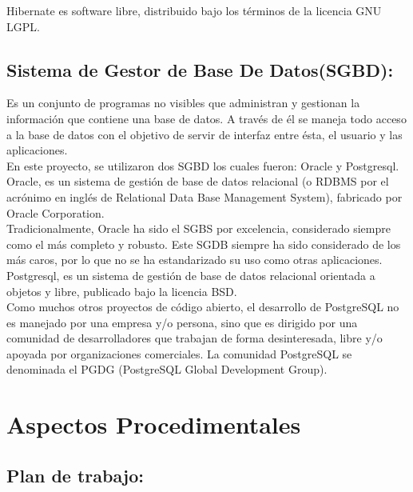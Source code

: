 \documentclass[12pt,oneside]{book}
\begin{document}
	Hibernate es software libre, distribuido bajo los términos de la licencia GNU LGPL.
	

	
	\section{Sistema de Gestor de Base De Datos(SGBD):}
	
	Es un conjunto de programas no visibles que administran y gestionan la información que contiene una base de datos. A través de él se maneja todo acceso a la base de datos con el objetivo de servir de interfaz entre ésta, el usuario y las aplicaciones.  \\
	
	En este proyecto, se utilizaron dos SGBD los cuales fueron: Oracle y Postgresql. \\
	
	Oracle, es un sistema de gestión de base de datos relacional (o RDBMS por el acrónimo en inglés de Relational Data Base Management System), fabricado por Oracle Corporation.\\
	
	Tradicionalmente, Oracle ha sido el SGBS por excelencia, considerado siempre como el más completo y robusto. Este SGDB siempre ha sido considerado de los más caros, por lo que no se ha estandarizado su uso como otras aplicaciones. \\
	
	Postgresql, es un sistema de gestión de base de datos relacional orientada a objetos y libre, publicado bajo la licencia BSD. \\
	
	Como muchos otros proyectos de código abierto, el desarrollo de PostgreSQL no es manejado por una empresa y/o persona, sino que es dirigido por una comunidad de desarrolladores que trabajan de forma desinteresada, libre y/o apoyada por organizaciones comerciales. La comunidad PostgreSQL se denominada el PGDG (PostgreSQL Global Development Group).



	
	
	
	\chapter{Aspectos Procedimentales}
	
	\section{Plan de trabajo:}
	
\end{document}
